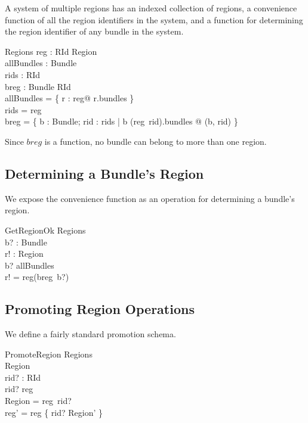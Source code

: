 \documentclass[a4paper,9pt]{article}
\begin{document}
A system of multiple regions has an indexed collection of regions, a convenience function of all the
region identifiers in the system, and a function for
determining the region identifier of any bundle in the system.
\begin{schema}{Regions}
  reg : RId \pfun Region \\
  allBundles : \power Bundle \\
  rids : \power RId \\
  breg : Bundle \pfun RId \\
\where
 allBundles = \bigcup \{ r : \ran reg@ r.bundles \} \\
 rids = \dom reg \\
 breg = \{ b : Bundle; rid : rids | b \in (reg~rid).bundles @ (b, rid) \} \\
\end{schema}
Since $breg$ is a function, no bundle can belong to more than one region.

\subsection{Determining a Bundle's Region}

We expose the convenience function as an operation for determining a bundle's region.
\begin{schema}{GetRegionOk}
  \Xi Regions \\
  b? : Bundle \\
  r! : Region \\
\where
  b? \in allBundles \\
  r! = reg(breg~b?) \\
\end{schema}

\subsection{Promoting Region Operations}

We define a fairly standard promotion schema.
\begin{schema}{PromoteRegion}
  \Delta Regions \\
  \Delta Region \\
  rid? : RId \\
\where
  rid? \in \dom reg \\
  \theta Region = reg~rid? \\
  reg' = reg \oplus \{ rid? \mapsto \theta Region' \} \\
\end{schema}
\end{document}
